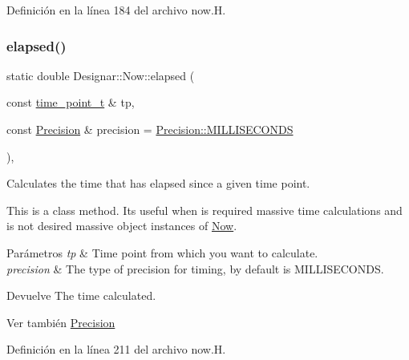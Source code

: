 Definición en la línea 184 del archivo now.\+H.

\mbox{\label{class_designar_1_1_now_a04cc67e3245b662b33b25a6eefe7e957}} 
\subsubsection{\texorpdfstring{elapsed()}{elapsed()}\hspace{0.1cm}{\footnotesize\ttfamily [2/2]}}
{\footnotesize\ttfamily static double Designar\+::\+Now\+::elapsed (\begin{DoxyParamCaption}\item[{const \hyperlink{namespace_designar_a0edbd598eadb672df2c70e5af4dfccee}{time\+\_\+point\+\_\+t} \&}]{tp,  }\item[{const \hyperlink{class_designar_1_1_now_a3c9f5e57907c88cbe63c70a64638c072}{Precision} \&}]{precision = {\ttfamily \hyperlink{class_designar_1_1_now_a3c9f5e57907c88cbe63c70a64638c072ab4fd5e5c06e72437a57379576df36936}{Precision\+::\+M\+I\+L\+L\+I\+S\+E\+C\+O\+N\+DS}} }\end{DoxyParamCaption})\hspace{0.3cm}{\ttfamily [inline]}, {\ttfamily [static]}}

Calculates the time that has elapsed since a given time point.

This is a class method. It\textquotesingle{}s useful when is required massive time calculations and is not desired massive object instances of \hyperlink{class_designar_1_1_now}{Now}.


\begin{DoxyParams}{Parámetros}
{\em tp} & Time point from which you want to calculate. \\
\hline
{\em precision} & The type of precision for timing, by default is M\+I\+L\+L\+I\+S\+E\+C\+O\+N\+DS. \\
\hline
\end{DoxyParams}
\begin{DoxyReturn}{Devuelve}
The time calculated. 
\end{DoxyReturn}
\begin{DoxySeeAlso}{Ver también}
\hyperlink{class_designar_1_1_now_a3c9f5e57907c88cbe63c70a64638c072}{Precision} 
\end{DoxySeeAlso}


Definición en la línea 211 del archivo now.\+H.

